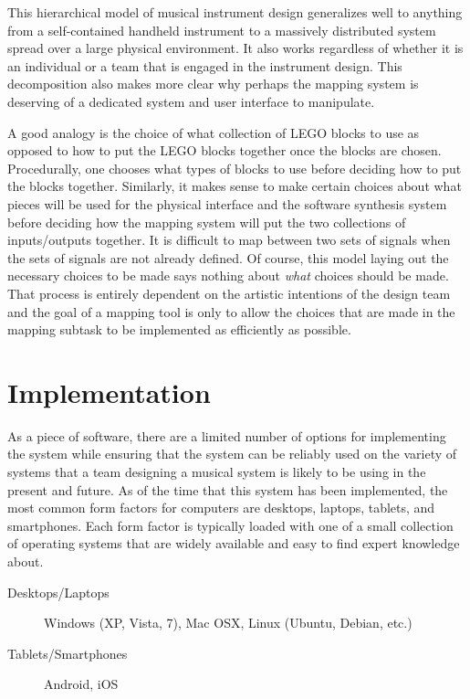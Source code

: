 This hierarchical model of musical instrument design generalizes well to anything from a self-contained handheld instrument to a massively distributed system spread over a large physical environment. It also works regardless of whether it is an individual or a team that is engaged in the instrument design. This decomposition also makes more clear why perhaps the mapping system is deserving of a dedicated system and user interface to manipulate. 

A good analogy is the choice of what collection of LEGO blocks to use as opposed to how to put the LEGO blocks together once the blocks are chosen. Procedurally, one chooses what types of blocks to use before deciding how to put the blocks together. Similarly, it makes sense to make certain choices about what pieces will be used for the physical interface and the software synthesis system before deciding how the mapping system will put the two collections of inputs/outputs together. It is difficult to map between two sets of signals when the sets of signals are not already defined. Of course, this model laying out the necessary choices to be made says nothing about \emph{what} choices should be made. That process is entirely dependent on the artistic intentions of the design team and the goal of a mapping tool is only to allow the choices that are made in the mapping subtask to be implemented as efficiently as possible.

\section{Implementation}

As a piece of software, there are a limited number of options for implementing the system while ensuring that the system can be reliably used on the variety of systems that a team designing a musical system is likely to be using in the present and future. As of the time that this system has been implemented, the most common form factors for computers are desktops, laptops, tablets, and smartphones. Each form factor is typically loaded with one of a small collection of operating systems that are widely available and easy to find expert knowledge about.

\begin{description}
\item[Desktops/Laptops] Windows (XP, Vista, 7), Mac OSX, Linux (Ubuntu, Debian, etc.)
\item[Tablets/Smartphones] Android, iOS
\end{description}

